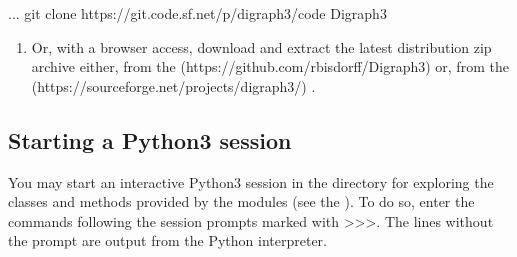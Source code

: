 \documentclass[a4paper,12pt,english]{sphinxhowto}
\begin{document}
\begin{sphinxVerbatim}[commandchars=\\\{\}]
...\PYGZdl{} git clone https://git.code.sf.net/p/digraph3/code Digraph3
\end{sphinxVerbatim}
\begin{enumerate}
%
\setcounter{enumi}{2}
\item {} 
Or, with a browser access, download and extract the latest distribution zip archive either, from the  (https://github.com/rbisdorff/Digraph3)  or, from the  (https://sourceforge.net/projects/digraph3/) .

\end{enumerate}


\subsection{Starting a Python3 session}
\label{\detokenize{tutorial:starting-a-python3-session}}
You may start an interactive Python3 session in the  directory for exploring the classes and methods provided by the  modules (see the ). To do so, enter the  commands following the session prompts marked with \textgreater{}\textgreater{}\textgreater{}. The lines without the prompt are output from the Python interpreter.
\end{document}
